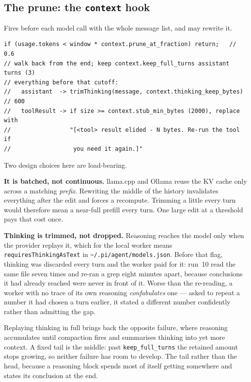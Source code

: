 \documentclass[11pt,a4paper]{article}
\newcommand{\file}[1]{\texttt{#1}}
\newcommand{\key}[1]{\texttt{#1}}
\begin{document}
\subsection{The prune: the \texttt{context} hook}

Fires before each model call with the whole message list, and may rewrite it.

\begin{lstlisting}
if (usage.tokens < window * context.prune_at_fraction) return;   // 0.6
// walk back from the end; keep context.keep_full_turns assistant turns (3)
// everything before that cutoff:
//   assistant  -> trimThinking(message, context.thinking_keep_bytes)   // 600
//   toolResult -> if size >= context.stub_min_bytes (2000), replace with
//                 "[<tool> result elided - N bytes. Re-run the tool if
//                  you need it again.]"
\end{lstlisting}

Two design choices here are load-bearing.

\textbf{It is batched, not continuous.} llama.cpp and Ollama reuse the KV cache
only across a matching \emph{prefix}. Rewriting the middle of the history
invalidates everything after the edit and forces a recompute. Trimming a little
every turn would therefore mean a near-full prefill every turn. One large edit
at a threshold pays that cost once.

\textbf{Thinking is trimmed, not dropped.} Reasoning reaches the model only
when the provider replays it, which for the local worker means
\key{requiresThinkingAsText} in \file{\textasciitilde/.pi/agent/models.json}.
Before that flag, thinking was discarded every turn and the worker paid for it:
run~10 read the same file seven times and re-ran a grep eight minutes apart,
because conclusions it had already reached were never in front of it. Worse than
the re-reading, a worker with no trace of its own reasoning \emph{confabulates}
one --- asked to repeat a number it had chosen a turn earlier, it stated a
different number confidently rather than admitting the gap.

Replaying thinking in full brings back the opposite failure, where reasoning
accumulates until compaction fires and summarises thinking into yet more
context. A fixed tail is the middle: past \key{keep\_full\_turns} the retained
amount stops growing, so neither failure has room to develop. The tail rather
than the head, because a reasoning block spends most of itself getting somewhere
and states its conclusion at the end.
\end{document}
